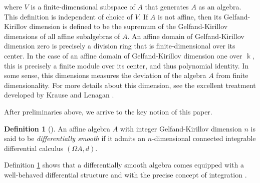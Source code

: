 \documentclass{amsart}
\theoremstyle{definition}
\newtheorem{definition}[theorem]{Definition}
\theoremstyle{remark}
\numberwithin{equation}{section}
\begin{document}
where $V$ is a finite-dimensional subspace of $A$ that generates $A$ as an algebra. This definition is independent of choice of $V$. If $A$ is not affine, then its Gelfand-Kirillov dimension is defined to be the supremum of the Gelfand-Kirillov dimensions of all affine subalgebras of $A$. An affine domain of Gelfand-Kirillov dimension zero is precisely a division ring that is finite-dimensional over its center. In the case of an affine domain of Gelfand-Kirillov dimension one over $\Bbbk$, this is precisely a finite module over its center, and thus polynomial identity. In some sense, this dimensions measures the deviation of the algebra $A$ from finite dimensionality. For more details about this dimension, see the excellent treatment developed by Krause and Lenagan \cite{KrauseLenagan2000}.

After preliminaries above, we arrive to the key notion of this paper.

\begin{definition}[{\cite[Definition 2.4]{BrzezinskiSitarz2017}}]\label{BrzezinskiSitarz2017Definition2.4}
An affine algebra $A$ with integer Gelfand-Kirillov dimension $n$ is said to be {\em differentially smooth} if it admits an $n$-dimensional connected integrable differential calculus $(\Omega A, d)$.
\end{definition}

Definition \ref{BrzezinskiSitarz2017Definition2.4} shows that a differentially smooth algebra comes equipped with a well-behaved differential structure and with the precise concept of integration \cite[p. 2414]{BrzezinskiLomp2018}.
\end{document}

